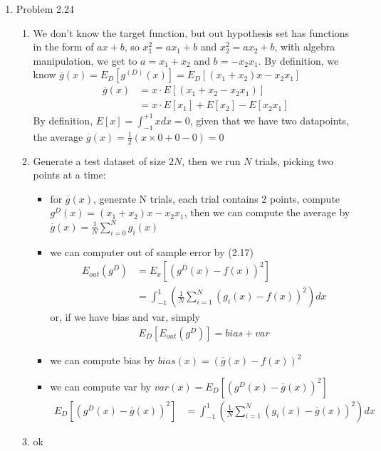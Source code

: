 \documentclass{article}
\begin{document}
\begin{enumerate}
        \item Problem 2.24
        \begin{enumerate}[label=(\alph*)]
            \item We don't know the target function, but out hypothesis set has functions in the form of $ax + b$, so $x^2_1 = ax_1 + b$ and $x^2_2 = ax_2 + b$, with algebra manipulation, we get to $a = x_1 + x_2$ and $b = -x_2x_1$. By definition, we know $\overline{g}(x) = E_D[g^{(D)}(x)] = E_D[(x_1+x_2)x - x_2x_1]$
            \begin{align*}
                    \overline{g}(x) &= x \cdot E[(x_1+x_2-x_2x_1)]\\
                    &= x \cdot E[x_1] + E[x_2] - E[x_2x_1]
            \end{align*}
            By definition, $E[x] = \int^{+1}_{-1}xdx = 0$, given that we have two datapoints, the average $\overline{g}(x) = \frac{1}{2}(x \times 0 + 0 - 0) = 0$
            
            \item Generate a test dataset of size $2N$, then we run $N$ trials, picking two points at a time:
            \begin{itemize}
                \item for $\overline{g}(x)$, generate N trials, each trial contains 2 points, compute $g^D(x) = (x_1 + x_2)x - x_2x_1$, then we can compute the average by $\overline{g}(x) = \frac{1}{N}\sum_{i = 0}^{N}g_i(x)$
                \item we can computer out of sample error by (2.17)
                \begin{align*}
                    E_{out}(g^D) &= E_x[(g^D(x) - f(x))^2]\\
                    &= \int_{-1}^{1}(\frac{1}{N}\sum_{i = 1}^{N}(g_i(x) - f(x))^2)dx
                \end{align*}
                or, if we have bias and var, simply
                \begin{align*}
                    E_D[E_{out}(g^D)] = bias + var
                \end{align*}
                \item we can compute bias by $bias(x) = (\overline{g}(x) - f(x))^2$
                \item we can compute var by $var(x) = E_D[(g^D(x) - \overline{g}(x))^2]$
                \begin{align*}
                    E_D[(g^D(x) - \overline{g}(x))^2] &= \int_{-1}^{1}(\frac{1}{N}\sum_{i = 1}^{N}(g_i(x) - \overline{g}(x))^2)dx
                \end{align*}
            \end{itemize}

            \item ok
        \end{enumerate}
    \end{enumerate}
\end{document}
